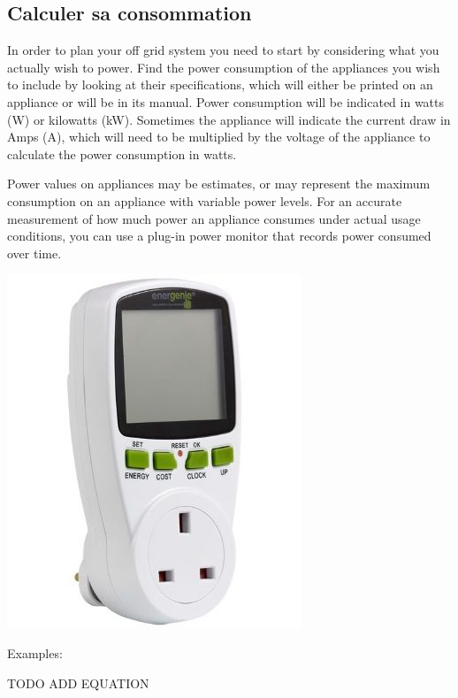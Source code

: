 \documentclass{article}
\theoremstyle{definition}
\theoremstyle{definition}
\theoremstyle{remark}
\begin{document}

  {\color{blue}\subsection{Calculer sa consommation}} %
  \label{sub:calculer_sa_consommation}

    In order to plan your off grid system you need to start by considering what you actually wish to power. Find the power consumption of the appliances you wish to include by looking at their specifications, which will either be printed on an appliance or will be in its manual. Power consumption will be indicated in watts (W) or kilowatts (kW). Sometimes the appliance will indicate the current draw in Amps (A), which will need to be multiplied by the voltage of the appliance to calculate the power consumption in watts.

    Power values on appliances may be estimates, or may represent the maximum consumption on an appliance with variable power levels. For an accurate measurement of how much power an appliance consumes under actual usage conditions, you can use a plug-in power monitor that records power consumed over time. 

    \begin{center}
      \includegraphics[width=0.15\paperwidth]{../Images/image_12_1_(watt_meter).png}
    \end{center}

    Examples: 

    TODO ADD EQUATION
\end{document}
